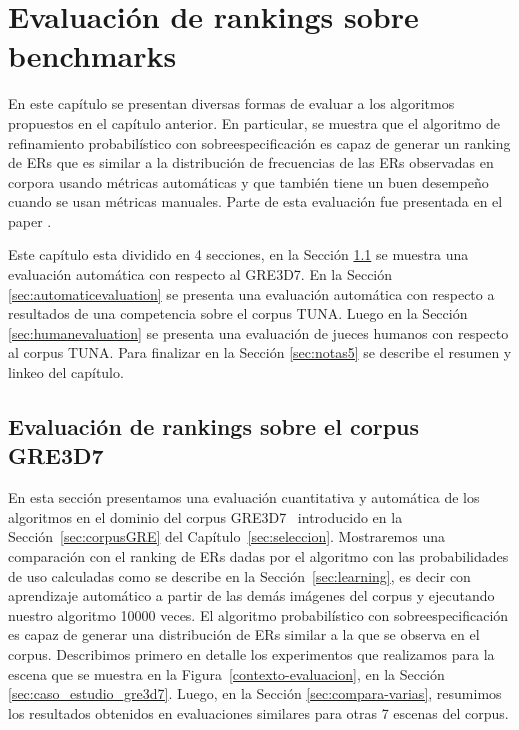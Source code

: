 \chapter{Evaluaci\'on de rankings sobre benchmarks}
\label{sec:evaluacion}

En este cap\'itulo se presentan diversas formas de evaluar a los algoritmos propuestos en el cap\'itulo anterior. En particular, se muestra que el algoritmo de refinamiento probabil\'{i}stico con sobreespecificaci\'on es capaz de generar un ranking de ERs que es similar a la distribuci\'on de frecuencias de las ERs observadas en corpora usando m\'etricas autom\'aticas y que tambi\'en tiene un buen desempe\~no cuando se usan m\'etricas manuales. Parte de esta evaluaci\'on fue presentada en el paper \cite{context2013}. 

Este cap\'itulo esta dividido en 4 secciones, en la Secci\'on \ref{sec:compara} se muestra una evaluaci\'on autom\'atica con respecto al GRE3D7. En la Secci\'on \ref{sec:automaticevaluation} se presenta una evaluaci\'on autom\'atica con respecto a resultados de una competencia sobre el corpus TUNA. Luego en la Secci\'on \ref{sec:humanevaluation} se presenta una evaluaci\'on de jueces humanos con respecto al corpus TUNA. Para finalizar en la Secci\'on \ref{sec:notas5} se describe el resumen y linkeo del cap\'itulo.

\section{Evaluaci\'on de rankings sobre el corpus GRE3D7}
\label{sec:compara}
En esta secci\'on presentamos una evaluaci\'on cuantitativa y autom\'atica de los algoritmos en el dominio del corpus GRE3D7~\cite{gre3d7} introducido en la Secci\'on~\ref{sec:corpusGRE} del Cap\'itulo~\ref{sec:seleccion}. Mostraremos una comparaci\'on con el ranking de ERs dadas por el algoritmo con las probabilidades de uso calculadas como se describe en la Secci\'on~\ref{sec:learning}, es decir con aprendizaje autom\'atico a partir de las dem\'as im\'agenes del corpus y ejecutando nuestro algoritmo 10000 veces. El algoritmo probabil\'istico con sobreespecificaci\'on es capaz de generar una distribuci\'on de ERs similar a la que se observa en el corpus. Describimos primero en detalle los experimentos que realizamos para la escena que se muestra en la Figura~\ref{contexto-evaluacion}, en la Secci\'on \ref{sec:caso_estudio_gre3d7}. Luego, en la Secci\'on \ref{sec:compara-varias}, resumimos los resultados obtenidos en evaluaciones similares para otras 7 escenas del corpus. 
